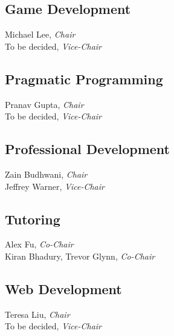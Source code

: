 \documentclass[10pt]{article}
\newcommand{\chair}[1]{#1, \textit{Chair}}
\newcommand{\vicechair}[1]{#1, \textit{Vice-Chair}}
\newcommand{\cochair}[1]{#1, \textit{Co-Chair}}
\begin{document}
\subsection{Game Development}

\chair{Michael Lee}\\
\vicechair{To be decided}

\subsection{Pragmatic Programming}

\chair{Pranav Gupta}\\
\vicechair{To be decided}

\subsection{Professional Development}

\chair{Zain Budhwani}\\
\vicechair{Jeffrey Warner}

\subsection{Tutoring}

\cochair{Alex Fu}\\
\cochair{Kiran Bhadury, Trevor Glynn}

\subsection{Web Development}

\chair{Teresa Liu}\\
\vicechair{To be decided}
\end{document}
